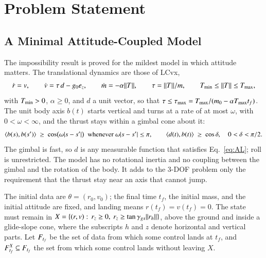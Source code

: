 \section{Problem Statement}\label{sec:problem}
\subsection{A Minimal Attitude-Coupled Model}
The impossibility result is proved for the mildest model in which attitude matters. The translational dynamics are those of
LCvx,
\begin{equation}\label{eq:dyn}
\dot r=v,\qquad \dot v=\tau\,d-g_0e_z,\qquad \dot m=-\alpha\lVert T\rVert,\qquad \tau=\lVert T\rVert/m,\qquad T_{\min}\le\lVert T\rVert\le T_{\max} ,
\end{equation}
with $T_{\min}>0$, $\alpha\ge0$, and $d$ a unit vector, so that $\tau\le\tau_{\max}=T_{\max}/(m_0-\alpha T_{\max} t_f)$. The unit body
axis $b(t)$ starts vertical and turns at a rate of at most $\omega$, with $0<\omega<\infty$, and the thrust stays within a
gimbal cone about it:
\begin{equation}\label{eq:AL}
\ip{b(s)}{b(s')}\ \ge\ \cos\bigl(\omega\lvert s-s'\rvert\bigr)\ \ \text{whenever }\omega\lvert s-s'\rvert\le\pi,\qquad
\ip{d(t)}{b(t)}\ \ge\ \cos\delta,\quad 0<\delta<\pi/2 .
\end{equation}
The gimbal is fast, so $d$ is any measurable function that satisfies Eq.~\eqref{eq:AL}; roll is unrestricted. The model has
no rotational inertia and no coupling between the gimbal and the rotation of the body. It adds to the 3-DOF problem only the
requirement that the thrust stay near an axis that cannot jump.

The initial data are $\theta=(r_0,v_0)$; the final time $t_f$, the initial mass, and the initial attitude are fixed, and
landing means $r(t_f)=v(t_f)=0$. The state must remain in $X=\{(r,v):\,r_z\ge0,\ r_z\ge\tan\gamma_{gs}\norm{r_h}\}$, above the
ground and inside a glide-slope cone, where the subscripts $h$ and $z$ denote horizontal and vertical parts. Let $F_{t_f}$ be the
set of data from which some control lands at $t_f$, and $F^{X}_{t_f}\subseteq F_{t_f}$ the set from which some control lands without
leaving $X$.

